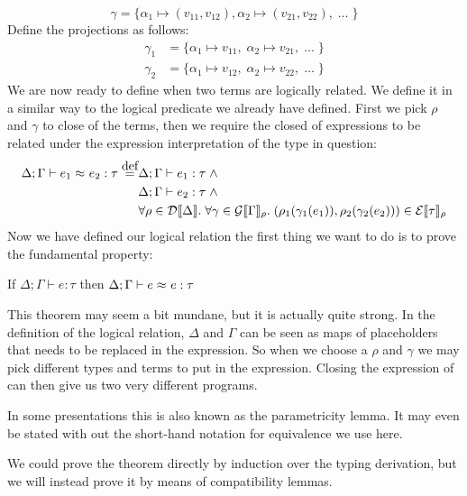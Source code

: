 \[
  \gamma = \{\alpha_1 \mapsto (v_{11},v_{12}), \alpha_2 \mapsto (v_{21},v_{22}),\; \dots\; \}
\]
Define the projections as follows:
\begin{align*}
  \gamma_1 & = \{\alpha_1 \mapsto v_{11}, \; \alpha_2 \mapsto v_{21},\; \dots \;\} \\
  \gamma_2 & = \{\alpha_1 \mapsto v_{12}, \; \alpha_2 \mapsto v_{22},\; \dots \;\}
\end{align*}
We are now ready to define when two terms are logically related. We define it in a similar way to the logical predicate we already have defined. First we pick $\rho$ and $\gamma$ to close of the terms, then we require the closed of expressions to be related under the expression interpretation of the type in question:
\renewcommand{\lreq}[2]{\equivalence{#1}{}{#2}}
\begin{align*}
  \Delta ; \Gamma \vdash \lreq{e_1}{e_2} : \tau \eqdef & \Delta ; \Gamma \vdash e_1 : \tau \pand\\
                                                      & \Delta ; \Gamma \vdash e_2 : \tau \pand \\
                                                      & \forall \rho \in \dpred{\Delta}. \; \forall \gamma \in \gprep{\Gamma}. \; (\rho_1(\gamma_1(e_1)),\rho_2(\gamma_2(e_2))) \in \eprep{\tau}
\end{align*}
Now we have defined our logical relation the first thing we want to do is to prove the fundamental property:
\begin{fundamentalprop}
  If $\Delta; \Gamma \vdash e : \tau$ then $\Delta; \Gamma \vdash \lreq{e}{e} : \tau$
\end{fundamentalprop}
This theorem may seem a bit mundane, but it is actually quite strong. In the definition of the logical relation, $\Delta$ and $\Gamma$ can be seen as maps of placeholders that needs to be replaced in the expression. So when we choose a $\rho$ and $\gamma$ we may pick different types and terms to put in the expression. Closing the expression of can then give us two very different programs. 

In some presentations this is also known as the parametricity lemma. It may even be stated with out the short-hand notation for equivalence we use here.

We could prove the theorem directly by induction over the typing derivation, but we will instead prove it by means of compatibility lemmas.
